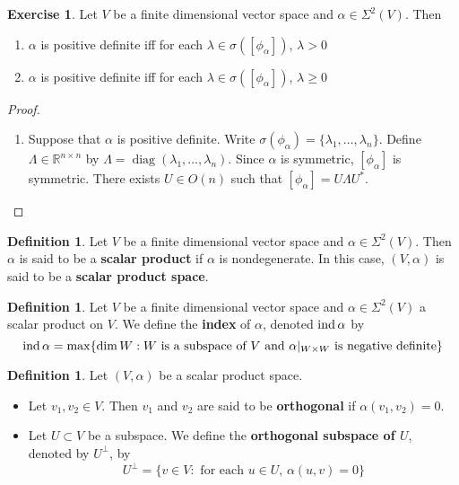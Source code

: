 \documentclass{book}
\theoremstyle{definition}
\newtheorem{defn}[definition]{Definition}
\newtheorem{ex}[definition]{Exercise}
\newcommand{\al}{\alpha}
\newcommand{\lam}{\lambda}
\newcommand{\sig}{\sigma}
\newcommand{\Lam}{\Lambda}
\newcommand{\Sig}{\Sigma}
\newcommand{\R}{\mathbb{R}}
\DeclareMathOperator{\diag}{\text{diag}}
\DeclareMathOperator*{\ind}{\text{\text{ind}}}
\DeclareMathOperator*{\0}{\mbf{0}}
\DeclareMathOperator*{\1}{\mbf{1}}
\newcommand{\tbf}[1]{\textbf{#1}}
\begin{document}
	\begin{ex}
		Let $V$ be a finite dimensional vector space and $\al \in \Sig^2(V)$. Then 
		\begin{enumerate}
			\item $\al$ is positive definite iff for each $\lam \in \sig([\phi_{\al}])$, $\lam > 0$
			\item $\al$ is positive definite iff for each $\lam \in \sig([\phi_{\al}])$, $\lam \geq 0$
		\end{enumerate}
		
		\begin{proof}\
			\begin{enumerate}
				\item Suppose that $\al$ is positive definite. Write $\sig(\phi_{\al}) = \{ \lam_1, \ldots, \lam_n\}$. Define $\Lam \in \R^{n \times n}$ by $\Lam = \diag(\lam_1, \ldots, \lam_n)$.  Since $\al$ is symmetric, $[\phi_{\al}]$ is symmetric. There exists $U \in O(n)$ such that $[\phi_{\al}] = U \Lam U^*$. 
			\end{enumerate}
		\end{proof}
	\end{ex}

		\begin{defn}
		Let $V$ be a finite dimensional vector space and $\al \in \Sig^2(V)$. Then $\al$ is said to be a \tbf{scalar product} if $\al$ is nondegenerate. In this case, $(V, \al)$ is said to be a \tbf{scalar product space}. 
	\end{defn}
	
	\begin{defn}
		Let $V$ be a finite dimensional vector space and $\al \in \Sig^2(V)$ a scalar product on $V$. We define the \tbf{index} of $\al$, denoted $\ind \al$ by 
		$$\ind \al = \max \{ \dim W: W \text{ is a subspace of $V$ and $\al|_{W \times W}$ is negative definite} \}$$
	\end{defn}

	\begin{defn}
		Let $(V, \al)$ be a scalar product space. 
		\begin{itemize}
			\item Let $v_1, v_2 \in V$. Then $v_1$ and $v_2$ are said to be \tbf{orthogonal} if $\al(v_1, v_2) = 0$. 
			\item Let $U \subset V$ be a subspace. We define the \tbf{orthogonal subspace of $U$}, denoted by $U^{\perp}$, by 
			$$U^{\perp} = \{v \in V: \text{ for each $u \in U$, $\al(u, v) = 0$}\}$$
		\end{itemize}
	\end{defn}
\end{document}
